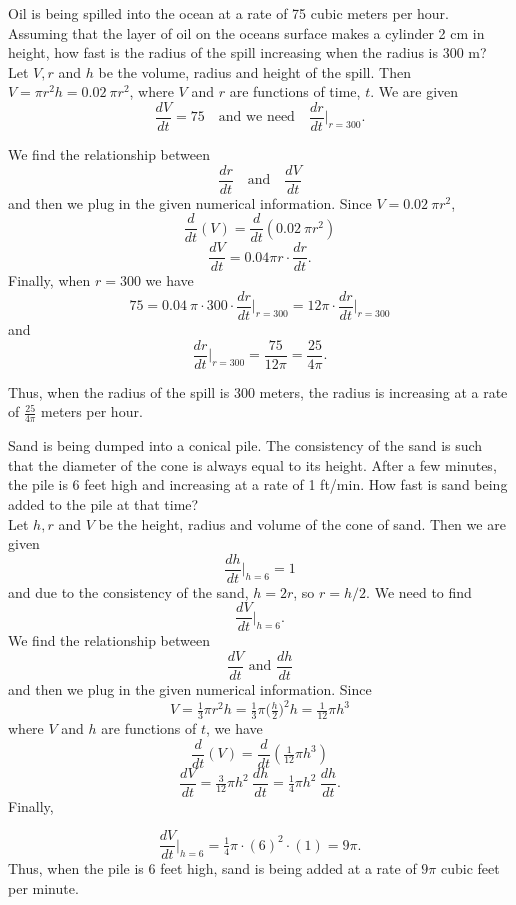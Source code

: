 \documentclass{ximera}
\begin{document}
\begin{example}[example 12]
Oil is being spilled into the ocean at a rate of 75 cubic meters per hour.  
Assuming that the layer of oil on the oceans surface makes a cylinder  2 cm in height, 
how fast is the radius of the spill increasing when the radius is 300 m?\\
Let $V, r$ and $h$ be the volume, radius and height of the spill.  Then $V = \pi r^2 h = 0.02 \ \pi r^2$,
where $V$ and $r$ are functions of time, $t$. We are given
\[\frac{dV}{dt} = 75 \quad \text{and we need} \quad \frac{dr}{dt}\bigg|_{r = 300}.\]

We find the relationship between 
\[\frac{dr}{dt} \quad \text{and}\quad \frac{dV}{dt}\]
and then we plug in the given numerical information.
Since $V =  0.02\  \pi r^2$,
\[\frac{d}{dt}(V) = \frac{d}{dt}(0.02 \ \pi r^2)\]
\[\frac{dV}{dt} = 0.04 \pi r \cdot \frac{dr}{dt}.\]
Finally, when $r = 300$ we have
\[75 = 0.04 \ \pi \cdot 300 \cdot \frac{dr}{dt}\bigg|_{r= 300} = 12 \pi \cdot \frac{dr}{dt}\bigg|_{r= 300} \]
and
\[\frac{dr}{dt}\bigg|_{r= 300} = \frac{75}{12\pi} = 
\frac{25}{4\pi}.\]





Thus, when the radius of the spill is 300 meters, the radius is increasing at a rate of $\frac{25}{4\pi}$ meters per hour.
\end{example}



\begin{example}[example 13]
Sand is being dumped into a conical pile. The consistency of the sand is such that the 
diameter of the cone is always equal to its height. After a few minutes,  the pile is 6 feet high and
increasing at a rate of 1 ft/min. How fast is sand being added to the pile at that time?\\

Let $h, r$ and $V$ be the height, radius and volume of the cone of sand. Then we are given
\[\frac{dh}{dt}\bigg|_{h = 6} = 1\]
and due to the consistency of the sand, $h = 2r$, so $r = h/2$.
We need to find 
\[\frac{dV}{dt}\bigg|_{h = 6}.\]
We find the relationship between 
\[\frac{dV}{dt} \text{ and } \frac{dh}{dt}\]
and then we plug in the given numerical information.
Since 
\[V = \tfrac13 \pi r^2 h = \tfrac13 \pi \big(\tfrac{h}{2}\big)^2 h = \tfrac{1}{12}\pi h^3\]
where $V$ and $h$ are functions of $t$, we have
\[\frac{d}{dt}(V) = \frac{d}{dt}(\tfrac{1}{12}\pi h^3)\]
\[\frac{dV}{dt} = \tfrac{3}{12}\pi h^2 \  \frac{dh}{dt} = \tfrac{1}{4}\pi h^2 \ \frac{dh}{dt}.\]
Finally,

\[\frac{dV}{dt}\bigg|_{h = 6} = \tfrac{1}{4}\pi \cdot (6)^2 \cdot(1) = 9\pi.\]
Thus, when the pile is 6 feet high, sand is being added at a rate of $9\pi$ cubic feet per minute.
\end{example}


\begin{center}
\begin{foldable}
\end{foldable}
\end{center}
\end{document}
